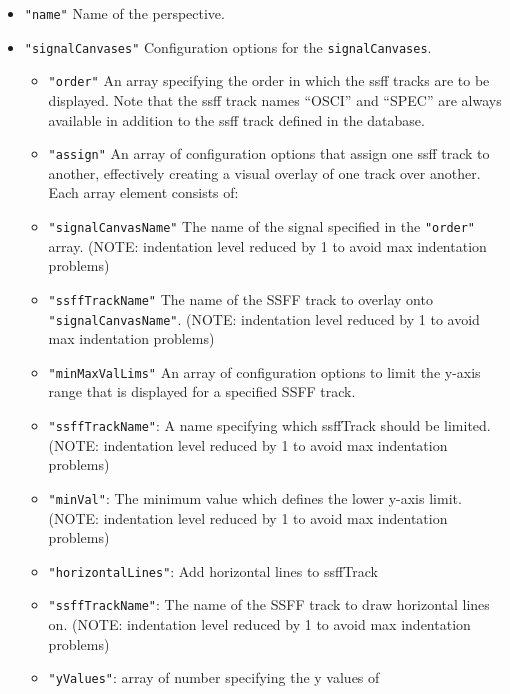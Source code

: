 \documentclass[]{book}
\theoremstyle{definition}
\theoremstyle{definition}
\theoremstyle{definition}
\theoremstyle{remark}
\begin{document}
\begin{itemize}
\begin{itemize}
    \begin{itemize}
    \item
      \texttt{"name"} Name of the perspective.
    \item
      \texttt{"signalCanvases"} Configuration options for the
      \texttt{signalCanvases}.

      \begin{itemize}
      \item
        \texttt{"order"} An array specifying the order in which the
        {ssff} tracks are to be displayed. Note that the {ssff} track
        names ``OSCI'' and ``SPEC'' are always available in addition to
        the {ssff} track defined in the database.
      \item
        \texttt{"assign"} An array of configuration options that assign
        one {ssff} track to another, effectively creating a visual
        overlay of one track over another. Each array element consists
        of:
      \item
        \texttt{"signalCanvasName"} The name of the signal specified in
        the \texttt{"order"} array. (NOTE: indentation level reduced by
        1 to avoid max indentation problems)
      \item
        \texttt{"ssffTrackName"} The name of the SSFF track to overlay
        onto \texttt{"signalCanvasName"}. (NOTE: indentation level
        reduced by 1 to avoid max indentation problems)
      \item
        \texttt{"minMaxValLims"} An array of configuration options to
        limit the y-axis range that is displayed for a specified SSFF
        track.
      \item
        \texttt{"ssffTrackName"}: A name specifying which ssffTrack
        should be limited. (NOTE: indentation level reduced by 1 to
        avoid max indentation problems)
      \item
        \texttt{"minVal"}: The minimum value which defines the lower
        y-axis limit. (NOTE: indentation level reduced by 1 to avoid max
        indentation problems)
      \item
        \texttt{"horizontalLines"}: Add horizontal lines to ssffTrack
      \item
        \texttt{"ssffTrackName"}: The name of the SSFF track to draw
        horizontal lines on. (NOTE: indentation level reduced by 1 to
        avoid max indentation problems)
      \item
        \texttt{"yValues"}: array of number specifying the y values of

\end{itemize}
\end{itemize}
\end{itemize}
\end{itemize}
\end{document}
